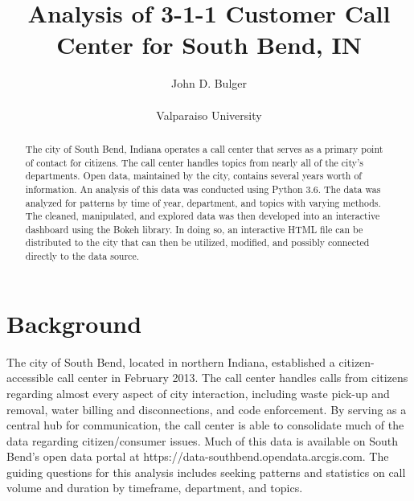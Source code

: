 \documentclass[11pt,twocolumn]{article}
\title{Analysis of 3-1-1 Customer Call Center for South Bend, IN}
\author{John D. Bulger\\
\\
Valparaiso University\\
}
\begin{document}
\maketitle

\begin{abstract}
The city of South Bend, Indiana operates a call center that serves as a primary point of contact for citizens.  The call center handles topics from nearly all of the city's departments.  Open data, maintained by the city, contains several years worth of information.  An analysis of this data was conducted using Python 3.6.  The data was 
analyzed for patterns by time of year, department, and topics with varying methods.  The cleaned, manipulated, and explored data was then developed into an 
interactive dashboard using the Bokeh library.  In doing so, an interactive HTML file can be distributed to the city that can then be utilized, modified, and possibly connected 
directly to the data source.
\end{abstract}

\section{Background}
The city of South Bend, located in northern Indiana, established a citizen-accessible call center in February 2013.  The call center handles calls from citizens regarding almost every aspect of city interaction, including waste pick-up and removal, water billing and disconnections, 
and code enforcement.  By serving as a central hub for communication, the call center is able to consolidate much of the data regarding citizen/consumer issues.  
Much of this data is available on South Bend's open data portal at https://data-southbend.opendata.arcgis.com.  The guiding questions for this analysis includes seeking patterns and statistics on call volume and duration by timeframe, department, and topics.
\end{document}
